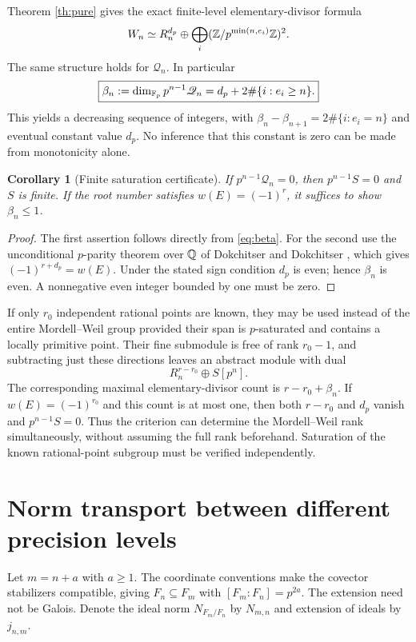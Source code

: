 \documentclass[11pt,a4paper]{article}
\newtheorem{corollary}[theorem]{Corollary}
\theoremstyle{definition}\newtheorem{definition}[theorem]{Definition}
\theoremstyle{remark}\newtheorem{remark}[theorem]{Remark}
\numberwithin{equation}{section}
\begin{document}
Theorem \ref{th:pure} gives the exact finite-level elementary-divisor formula
\begin{equation}\label{eq:Wstructure}
W_n\simeq R_n^{d_p}\oplus\bigoplus_i(\mathbb Z/p^{\min(n,e_i)}\mathbb Z)^2.
\end{equation}
The same structure holds for $\mathscr Q_n$. In particular
\begin{equation}\label{eq:beta}
\boxed{\beta_n:=\dim_{\mathbb F_p}p^{n-1}\mathscr Q_n
=d_p+2\#\{i:e_i\ge n\}.}
\end{equation}
This yields a decreasing sequence of integers, with $\beta_n-\beta_{n+1}=2\#\{i:e_i=n\}$ and eventual constant value $d_p$. No inference that this constant is zero can be made from monotonicity alone.

\begin{corollary}[Finite saturation certificate]\label{cor:finite}
If $p^{n-1}\mathscr Q_n=0$, then $p^{n-1}S=0$ and $S$ is finite. If the root number satisfies $w(E)=(-1)^r$, it suffices to show $\beta_n\le1$.
\end{corollary}
\begin{proof}
The first assertion follows directly from \eqref{eq:beta}. For the second use the unconditional $p$-parity theorem over $\mathbb Q$ of Dokchitser and Dokchitser \cite{DD}, which gives $(-1)^{r+d_p}=w(E)$. Under the stated sign condition $d_p$ is even; hence $\beta_n$ is even. A nonnegative even integer bounded by one must be zero.\end{proof}

If only $r_0$ independent rational points are known, they may be used instead of the entire Mordell--Weil group provided their span is $p$-saturated and contains a locally primitive point. Their fine submodule is free of rank $r_0-1$, and subtracting just these directions leaves an abstract module with dual
\[
R_n^{r-r_0}\oplus S[p^n].
\]
The corresponding maximal elementary-divisor count is $r-r_0+\beta_n$. If $w(E)=(-1)^{r_0}$ and this count is at most one, then both $r-r_0$ and $d_p$ vanish and $p^{n-1}S=0$. Thus the criterion can determine the Mordell--Weil rank simultaneously, without assuming the full rank beforehand. Saturation of the known rational-point subgroup must be verified independently.
\clearpage
\section{Norm transport between different precision levels}\label{sec:norm}
Let $m=n+a$ with $a\ge1$. The coordinate conventions make the covector stabilizers compatible, giving $F_n\subseteq F_m$ with $[F_m:F_n]=p^{2a}$. The extension need not be Galois. Denote the ideal norm $N_{F_m/F_n}$ by $N_{m,n}$ and extension of ideals by $j_{n,m}$.
\end{document}
